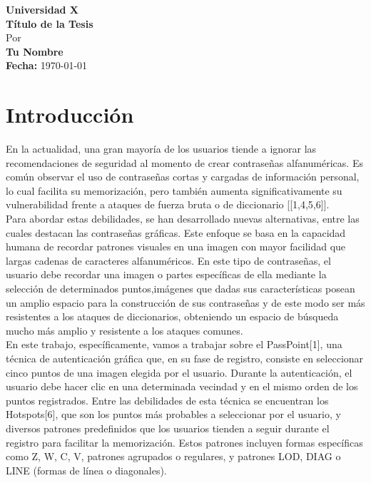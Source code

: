 \documentclass[12pt]{report}
\begin{document}
\begin{titlepage}
    \centering
    {\Large \textbf{Universidad X}}\\[2cm]
    {\Huge \textbf{Título de la Tesis}}\\[1.5cm]
    {\large Por}\\[0.5cm]
    {\Large \textbf{Tu Nombre}}\\[2cm]
    \vfill
    {\large \textbf{Fecha:} \today}
\end{titlepage}

\tableofcontents
\newpage

\chapter*{Introducción}
\hypertarget{introduccion}{}


	En la actualidad, una gran mayoría de los usuarios tiende a ignorar las recomendaciones de seguridad al momento de crear contraseñas alfanuméricas. Es común observar el uso de contraseñas cortas y cargadas de información personal, lo cual facilita su memorización, pero también aumenta significativamente su vulnerabilidad frente a ataques de fuerza bruta o de diccionario [[1,4,5,6]].\\
	
	Para abordar estas debilidades, se han desarrollado nuevas alternativas, entre las cuales destacan las contraseñas gráficas. Este enfoque se basa en la capacidad humana de recordar patrones visuales en una imagen con mayor facilidad que largas cadenas de caracteres alfanuméricos. En este tipo de contraseñas, el usuario debe recordar una imagen o partes específicas de ella mediante la selección  de determinados puntos,imágenes que dadas sus características posean un amplio espacio para la construcción de sus contraseñas y de este modo ser más resistentes a los ataques de diccionarios, obteniendo un espacio de búsqueda mucho más amplio y resistente a los ataques comunes.\\
	
	En este trabajo, específicamente, vamos a trabajar sobre el PassPoint[1], una técnica de autenticación gráfica que, en su fase de registro, consiste en seleccionar cinco puntos de una imagen elegida por el usuario. Durante la autenticación, el usuario debe hacer clic en una determinada vecindad y en el mismo orden de los puntos registrados. Entre las debilidades de esta técnica se encuentran los Hotspots[6], que son los puntos más probables a seleccionar por el usuario, y diversos patrones predefinidos que los usuarios tienden a seguir durante el registro para facilitar la memorización. Estos patrones incluyen formas específicas como Z, W, C, V, patrones agrupados o regulares, y patrones LOD, DIAG o LINE (formas de línea o diagonales).
	
\end{document}
